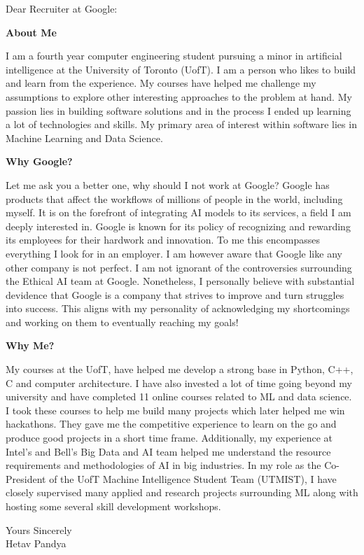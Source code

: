 \documentclass[a4paper,english]{friggeri-letter}
\begin{document}

\address{
   85 Wood St \\
   Toronto, ON, Canada
}





\opening{Dear Recruiter at Google:}

\textbf{About Me}

I am a fourth year computer engineering student pursuing a minor in artificial intelligence at the University of Toronto (UofT). I am a person who likes to build and learn from the experience. My courses have helped me challenge my assumptions to explore other interesting approaches to the problem at hand. My passion lies in building software solutions and in the process I ended up learning a lot of technologies and skills. My primary area of interest within software lies in Machine Learning and Data Science.

\textbf{Why Google?}

Let me ask you a better one, why should I not work at Google? 
Google has products that affect the workflows of millions of people in the world, including myself. 
It is on the forefront of integrating AI models to its services, a field I am deeply interested in. 
Google is known for its policy of recognizing and rewarding its employees for their hardwork and innovation. 
To me this encompasses everything I look for in an employer. 
I am however aware that Google like any other company is not perfect. I am not ignorant of the controversies surrounding the Ethical AI team at Google. 
Nonetheless, I personally believe with substantial devidence that Google is a company that strives to improve and turn struggles into success. 
This aligns with my personality of acknowledging my shortcomings and working on them to eventually reaching my goals!

\textbf{Why Me?}

My courses at the UofT, have helped me develop a strong base in Python, C++, C and computer architecture. I have also invested a lot of time going beyond my university and have completed 11 online courses related to ML and data science. I took these courses to help me build many projects which later helped me win hackathons. They gave me the competitive experience to learn on the go and produce good projects in a short time frame. Additionally, my experience at Intel's and Bell's Big Data and AI team helped me understand the resource requirements and methodologies of AI in big industries. In my role as the Co-President of the UofT Machine Intelligence Student Team (UTMIST), I have closely supervised many applied and research projects surrounding ML along with hosting some several skill development workshops.

\vspace*{0.1cm}
\closing{
   Yours Sincerely\\
   Hetav Pandya}
\end{document}
